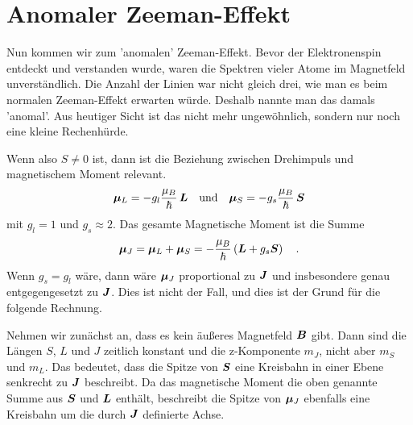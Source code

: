 \section{Anomaler Zeeman-Effekt}

Nun kommen wir zum 'anomalen' Zeeman-Effekt. Bevor der Elektronenspin entdeckt und verstanden wurde, waren die Spektren vieler Atome im Magnetfeld unverständlich. Die Anzahl der Linien war nicht gleich drei, wie man es beim normalen Zeeman-Effekt erwarten würde. Deshalb nannte man das damals 'anomal'. Aus heutiger Sicht ist das nicht mehr ungewöhnlich, sondern nur noch eine kleine Rechenhürde.

Wenn also $S \neq 0$ ist, dann ist die Beziehung zwischen Drehimpuls und magnetischem Moment relevant.
\begin{equation}
    \boldsymbol{\mu}_L = - g_l \frac{\mu_B}{\hbar} \, \boldsymbol{L} \quad \text{und} \quad  \boldsymbol{\mu}_S = - g_s \frac{\mu_B}{\hbar} \, \boldsymbol{S}
\end{equation}
mit $g_l = 1$ und $g_s \approx 2$. Das gesamte Magnetische Moment ist die Summe
\begin{equation}
    \boldsymbol{\mu}_J =  \boldsymbol{\mu}_L +  \boldsymbol{\mu}_S = - \frac{\mu_B}{\hbar} \left( \boldsymbol{L} + g_s \boldsymbol{S} \right)  \quad .
\end{equation}
Wenn $g_s = g_l$ wäre, dann wäre $\boldsymbol{\mu}_J$ proportional zu $\boldsymbol{J}$ und insbesondere genau entgegengesetzt zu $\boldsymbol{J}$. Dies ist nicht der Fall, und dies ist der Grund für die folgende Rechnung.

Nehmen wir zunächst an, dass es kein äußeres Magnetfeld $\boldsymbol{B}$ gibt. Dann sind die Längen $S$, $L$ und $J$ zeitlich konstant und die z-Komponente  $m_J$, nicht aber $m_S$ und $m_L$. Das bedeutet, dass die Spitze von $\boldsymbol{S}$ eine Kreisbahn in einer Ebene senkrecht zu $\boldsymbol{J}$ beschreibt. Da das magnetische Moment die oben genannte Summe aus $\boldsymbol{S}$ und $\boldsymbol{L}$ enthält, beschreibt die Spitze von $\boldsymbol{\mu}_J$ ebenfalls eine Kreisbahn um die durch $\boldsymbol{J}$ definierte Achse.

